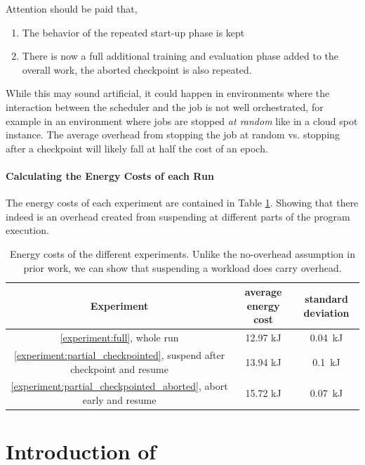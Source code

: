 Attention should be paid that,

\begin{enumerate}
    \item The behavior of the repeated start-up phase is kept
    \item There is now a full additional training and evaluation phase added to the overall work, the aborted checkpoint is also repeated.
\end{enumerate}

While this may sound artificial, it could happen in environments where the interaction between the scheduler and the job is not well orchestrated, for example in an environment where jobs are stopped \emph{at random} like in a cloud spot instance. 
The average overhead from stopping the job at random vs. stopping after a checkpoint will likely fall at half the cost of an epoch.

\paragraph{Calculating the Energy Costs of each Run}

The energy costs of each experiment are contained in Table \ref{tab:experiment_overhead}. 
Showing that there indeed is an overhead created from suspending at different parts of the program execution.

\begin{table}[h!]
    \centering
    \begin{tabular}{|c|c|c|}
    \hline
        Experiment & average energy cost & standard deviation \\ \hline
        \ref{experiment:full}, whole run &  12.97 kJ & 0.04~kJ \\ \hline
        \ref{experiment:partial_checkpointed}, suspend after checkpoint and resume &  13.94  kJ & 0.1~kJ \\ \hline
        \ref{experiment:partial_checkpointed_aborted}, abort early and resume &  15.72 kJ & 0.07~kJ \\ \hline
    \end{tabular}
    \caption{Energy costs of the different experiments. Unlike the no-overhead assumption in prior work, we can show that suspending a workload does carry overhead.}
\label{tab:experiment_overhead}
\end{table}

\section{Introduction of \modelname} \label{sec:improving_the_model}

